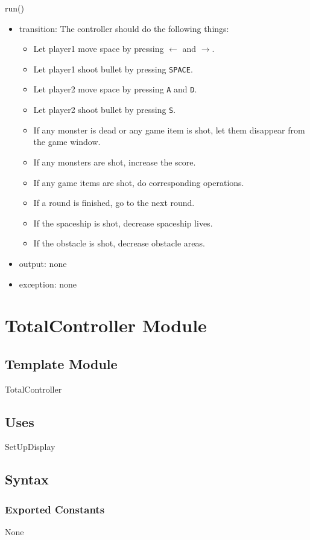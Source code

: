 \documentclass[12pt]{article}
\begin{document}
\noindent run()
\begin{itemize}
\item transition: The controller should do the following things:
\begin{itemize}
\item Let player1 move space by pressing $\leftarrow$ and $\rightarrow$.
\item Let player1 shoot bullet by pressing \verb|SPACE|.
\item Let player2 move space by pressing \verb|A| and \verb|D|.
\item Let player2 shoot bullet by pressing \verb|S|.
\item If any monster is dead or any game item is shot, let them disappear from the game window. 
\item If any monsters are shot, increase the score.
\item If any game items are shot, do corresponding operations. 
\item If a round is finished, go to the next round.
\item If the spaceship is shot, decrease spaceship lives.
\item If the obstacle is shot, decrease obstacle areas.
\end{itemize}
\item output: none
\item exception: none
\end{itemize}
\newpage

\section{TotalController Module}

\subsection*{Template Module}
TotalController

\subsection*{Uses}
SetUpDisplay

\subsection*{Syntax}
\subsubsection*{Exported Constants}
None
\end{document}
